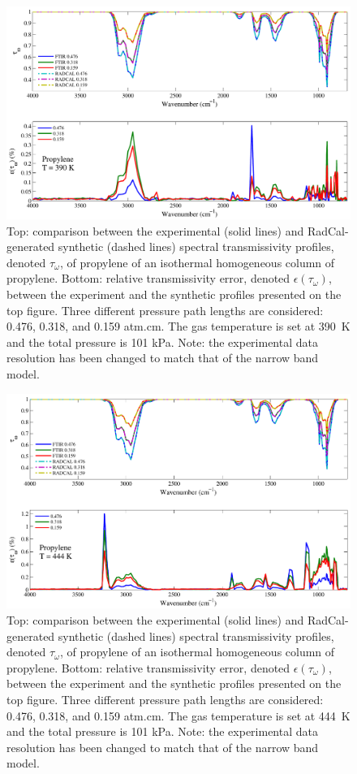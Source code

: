 \begin{figure}[p]
\includegraphics[width=\textwidth]{../Verification/Results_Test2/Propylene_390.pdf}
\caption{Top: comparison between the experimental (solid lines) and RadCal-generated synthetic (dashed lines) spectral transmissivity profiles, denoted $\tau_{\omega}$, of propylene of an isothermal homogeneous column of propylene. Bottom: relative transmissivity error, denoted $\epsilon{(\tau_{\omega})}$, between the experiment and the synthetic profiles presented on the top figure. Three different pressure path lengths are considered: 0.476, 0.318, and 0.159 atm.cm. The gas temperature is set at 390~K and the total pressure is 101 kPa. Note: the experimental data resolution has been changed to match that of the narrow band model. \label{fig:propylene_Verify_390K}}
\end{figure}

\begin{figure}[p]
\includegraphics[width=\textwidth]{../Verification/Results_Test2/Propylene_444.pdf}
\caption{Top: comparison between the experimental (solid lines) and RadCal-generated synthetic (dashed lines) spectral transmissivity profiles, denoted $\tau_{\omega}$, of propylene of an isothermal homogeneous column of propylene. Bottom: relative transmissivity error, denoted $\epsilon{(\tau_{\omega})}$, between the experiment and the synthetic profiles presented on the top figure. Three different pressure path lengths are considered: 0.476, 0.318, and 0.159 atm.cm. The gas temperature is set at 444~K and the total pressure is 101 kPa. Note: the experimental data resolution has been changed to match that of the narrow band model. \label{fig:propylene_Verify_444K}}
\end{figure}

